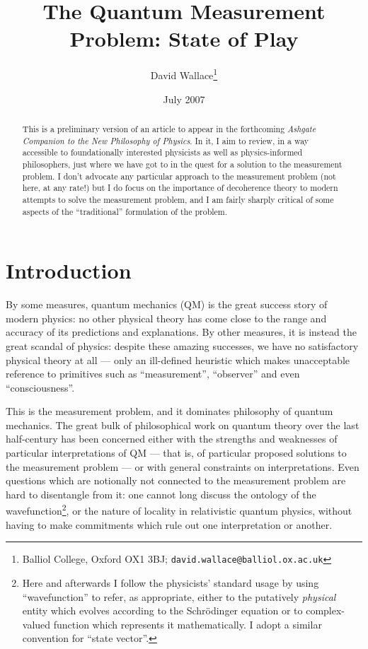 \documentclass[12pt]{article}
\begin{document}
\title{\Large The Quantum Measurement Problem: State of Play}
\author{\Large David Wallace\thanks{Balliol College, Oxford OX1 3BJ; \texttt{david.wallace@balliol.ox.ac.uk}}}
\date{\normalsize July 2007}
\maketitle

\begin{abstract}
This is a preliminary version of an article to appear in the forthcoming \emph{Ashgate Companion to the New Philosophy of Physics}. In it, I aim to review, in a way accessible to foundationally interested physicists as well as physics-informed philosophers, just where we have got to in the quest for a solution to the measurement problem. I don't advocate any particular approach to the measurement problem (not here, at any rate!) but I do focus on the importance of decoherence theory to modern attempts to solve the measurement problem, and I am fairly sharply critical of some aspects of the ``traditional'' formulation of the problem.
\end{abstract} 

\newpage

\section*{Introduction}

By some measures, quantum mechanics (QM) is the great success story of modern physics: no other physical theory has come close to the range and accuracy of its predictions and explanations. By other measures, it is instead the great scandal of physics: despite these amazing successes, we have no satisfactory physical theory at all --- only an ill-defined heuristic which makes unacceptable reference to primitives such as ``measurement'', ``observer'' and even ``consciousness''.

This is the measurement problem, and it dominates philosophy of quantum mechanics. The great bulk of philosophical  work on quantum theory over the last half-century has been concerned either with the strengths and weaknesses of particular interpretations of QM --- that is, of particular proposed solutions to the measurement problem --- or with general constraints  on interpretations. Even questions which are notionally not connected to the measurement problem are hard to disentangle from it: one cannot long discuss the ontology of the wavefunction\footnote{Here and afterwards I follow the physicists' standard usage by using ``wavefunction'' to refer, as appropriate, either to the putatively \emph{physical} entity which evolves according to the Schr\"{o}dinger equation or to complex-valued function which represents it mathematically. I adopt a similar convention for ``state vector''.}, or the nature of locality in relativistic quantum physics, without having to make commitments which rule out one interpretation or another.
\end{document}
